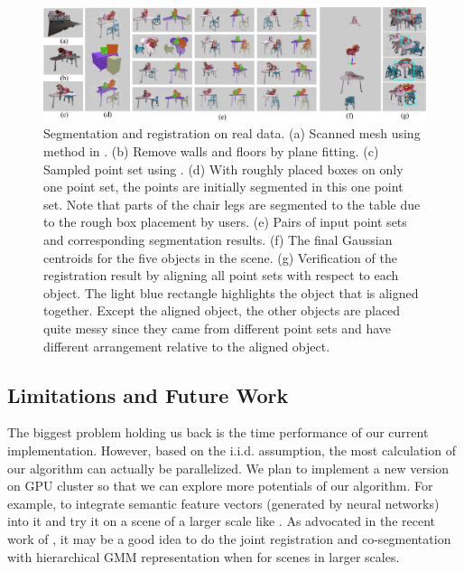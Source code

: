 \begin{figure}
	\centering
	\includegraphics[width=\linewidth]{images/realdata/realdata}
	\caption{\label{fig:realdata} Segmentation and registration on real data. (a) Scanned mesh using method in \cite{VXH}. (b) Remove walls and floors by plane fitting. (c) Sampled point set using \cite{PossionSampling}. (d) With roughly placed boxes on only one point set, the points are initially segmented in this one point set. Note that parts of the chair legs are segmented to the table due to the rough box placement by users. (e) Pairs of input point sets and corresponding segmentation results. (f) The final Gaussian centroids for the five objects in the scene. (g) Verification of the registration result by aligning all point sets with respect to each object. The light blue rectangle highlights the object that is aligned together. Except the aligned object, the other objects are placed quite messy since they came from different point sets and have different arrangement relative to the aligned object.   }
\end{figure} 


%
\subsection{Limitations and Future Work}
The biggest problem holding us back is the time performance of our current implementation. 
However, based on the i.i.d. assumption, the most calculation of our algorithm can actually be parallelized. 
We plan to implement a new version on GPU cluster so that we can explore more potentials of our algorithm. 
For example, to integrate semantic feature vectors (generated by neural networks) into it and try it on a scene of a larger scale like \cite{GOGMA}. 
As advocated in the recent work of \cite{AGM}, it may be a good idea to do the joint registration and co-segmentation with hierarchical GMM representation when for scenes in larger scales. 
